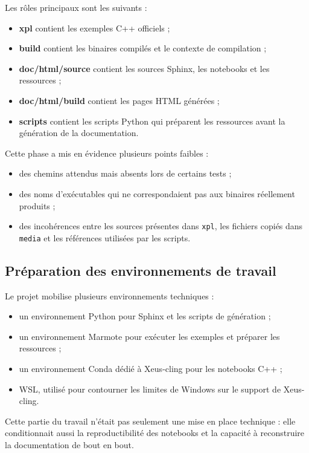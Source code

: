 \documentclass[a4paper,12pt,twoside]{article}
\begin{document}
Les rôles principaux sont les suivants :
\begin{itemize}
    \item \textbf{xpl} contient les exemples C++ officiels ;
    \item \textbf{build} contient les binaires compilés et le contexte de compilation ;
    \item \textbf{doc/html/source} contient les sources Sphinx, les notebooks et les ressources ;
    \item \textbf{doc/html/build} contient les pages HTML générées ;
    \item \textbf{scripts} contient les scripts Python qui préparent les ressources avant la génération de la documentation.
\end{itemize}

Cette phase a mis en évidence plusieurs points faibles :
\begin{itemize}
    \item des chemins attendus mais absents lors de certains tests ;
    \item des noms d'exécutables qui ne correspondaient pas aux binaires réellement produits ;
    \item des incohérences entre les sources présentes dans \texttt{xpl}, les fichiers copiés dans \texttt{media} et les références utilisées par les scripts.
\end{itemize}

\subsection{Préparation des environnements de travail}

Le projet mobilise plusieurs environnements techniques :
\begin{itemize}
    \item un environnement Python pour Sphinx et les scripts de génération ;
    \item un environnement Marmote pour exécuter les exemples et préparer les ressources ;
    \item un environnement Conda dédié à Xeus-cling pour les notebooks C++ ;
    \item WSL, utilisé pour contourner les limites de Windows sur le support de Xeus-cling.
\end{itemize}

Cette partie du travail n'était pas seulement une mise en place technique : elle conditionnait aussi la reproductibilité des notebooks et la capacité à reconstruire la documentation de bout en bout.
\end{document}
